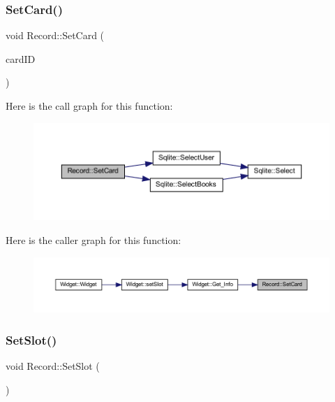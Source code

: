 \subsubsection{\texorpdfstring{SetCard()}{SetCard()}}
{\footnotesize\ttfamily void Record\+::\+Set\+Card (\begin{DoxyParamCaption}\item[{Q\+String}]{card\+ID }\end{DoxyParamCaption})}

Here is the call graph for this function\+:
\nopagebreak
\begin{figure}[H]
\begin{center}
\leavevmode
\includegraphics[width=350pt]{class_record_ac08eeade2dbe9fd49ba7d508865f2ab1_cgraph}
\end{center}
\end{figure}
Here is the caller graph for this function\+:
\nopagebreak
\begin{figure}[H]
\begin{center}
\leavevmode
\includegraphics[width=350pt]{class_record_ac08eeade2dbe9fd49ba7d508865f2ab1_icgraph}
\end{center}
\end{figure}
\mbox{\label{class_record_acc7b3423b809a15465c21f51353392d5}} 
\subsubsection{\texorpdfstring{SetSlot()}{SetSlot()}}
{\footnotesize\ttfamily void Record\+::\+Set\+Slot (\begin{DoxyParamCaption}{ }\end{DoxyParamCaption})}

